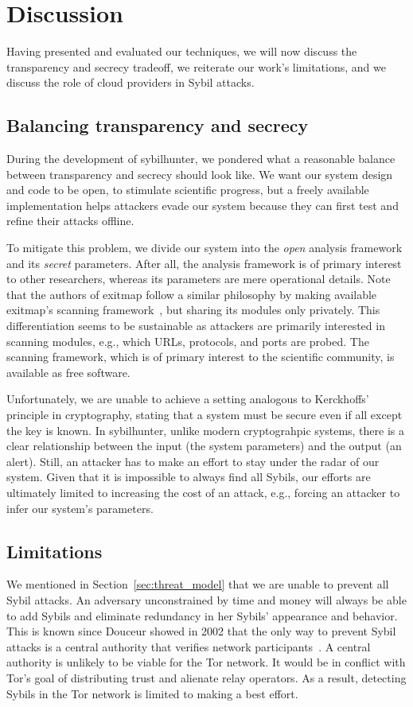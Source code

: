 \section{Discussion}
\label{sec:discussion}
Having presented and evaluated our techniques, we will now discuss the
transparency and secrecy tradeoff, we reiterate our work's limitations, and we
discuss the role of cloud providers in Sybil attacks.

\subsection{Balancing transparency and secrecy}
\label{sec:secrecy}
During the development of sybilhunter, we pondered what a reasonable balance
between transparency and secrecy should look like.  We want our system design
and code to be open, to stimulate scientific progress, but a freely available
implementation helps attackers evade our system because they can first test and
refine their attacks offline.

To mitigate this problem, we divide our system into the \emph{open} analysis
framework and its \emph{secret} parameters.  After all, the analysis framework
is of primary interest to other researchers, whereas its parameters are mere
operational details.  Note that the authors of exitmap follow a similar
philosophy by making available exitmap's scanning framework~\cite{exitmap}, but
sharing its modules only privately.  This differentiation seems to be
sustainable as attackers are primarily interested in scanning modules, e.g.,
which URLs, protocols, and ports are probed.  The scanning framework, which is
of primary interest to the scientific community, is available as free software.

Unfortunately, we are unable to achieve a setting analogous to Kerckhoffs'
principle in cryptography, stating that a system must be secure even if all
except the key is known.  In sybilhunter, unlike modern cryptograhpic systems,
there is a clear relationship between the input (the system parameters) and the
output (an alert).  Still, an attacker has to make an effort to stay under the
radar of our system.  Given that it is impossible to always find all Sybils, our
efforts are ultimately limited to increasing the cost of an attack, e.g.,
forcing an attacker to infer our system's parameters.

\subsection{Limitations}
\label{sec:limitations}
We mentioned in Section~\ref{sec:threat_model} that we are unable to prevent all
Sybil attacks.  An adversary unconstrained by time and money will always be able
to add Sybils and eliminate redundancy in her Sybils' appearance and behavior.
This is known since Douceur showed in 2002 that the only way to prevent Sybil
attacks is a central authority that verifies network
participants~\cite{Douceur2002a}.  A central authority is unlikely to be viable
for the Tor network.  It would be in conflict with Tor's goal of distributing
trust and alienate relay operators.  As a result, detecting Sybils in the Tor
network is limited to making a best effort.

